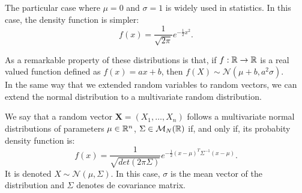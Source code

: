 The particular case where $\mu = 0$ and $\sigma = 1$ is widely used in statistics. In this case, the density function is simpler:
\[
f(x) = \frac{1}{\sqrt{2\pi}}e^{-\frac{1}{2}x^2}.
\]

As a remarkable property of these distributions is that, if $f : \mathbb{R} \to \mathbb{R}$ is a real valued function defined 
as $f(x) = ax+b$, then $f(X) \sim \mathcal N (\mu + b, a^2 \sigma)$.\\

In the same way that we extended random variables to random vectors, we can extend the normal distribution to a multivariate
random distribution.

\begin{ndef}
We say that a random vector $\bm{X} = (X_1,\dots,X_n)$ follows a multivariate normal distributions of parameters
$\mu \in \mathbb{R}^n$, $\Sigma \in \mathcal M_N(\mathbb{R})$ if, and only if, its probabity density function is:
\[
f(x) = \frac{1}{\sqrt{det(2\pi \Sigma)}}e^{-\frac{1}{2}(x - \mu )^T \Sigma^{-1} (x-\mu)}.
\]
It is denoted $X \sim \mathcal N(\mu, \Sigma)$.
In this case, $\sigma$ is the mean vector of the distribution and $\Sigma$ denotes de covariance matrix.  
\end{ndef}